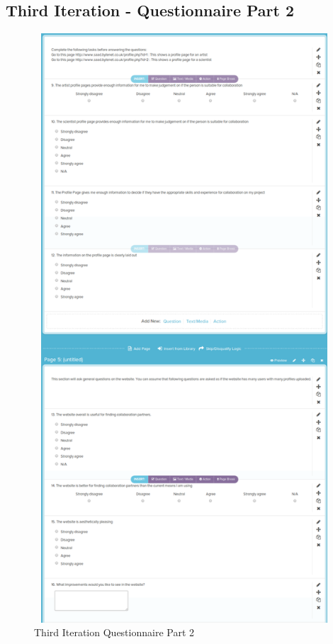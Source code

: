 \documentclass[a4paper,oneside,11pt]{report}
\begin{document}
\begin{appendices}
\section{Third Iteration - Questionnaire Part 2}
\begin{figure}[!ht]
\centering
\includegraphics[width=14cm,height=22cm]{appendix/second-iteration-questionnaire-2.png}
\caption{Third Iteration Questionnaire Part 2}
\end{figure}

\pagebreak

\end{appendices}
\end{document}
